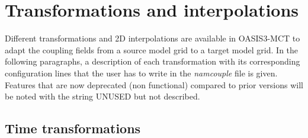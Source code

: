 \newpage
\chapter{Transformations and interpolations}
\label{sec_transformations}

Different transformations and 2D interpolations are available in
OASIS3-MCT to adapt the coupling fields from a source model grid to a
target model grid.  In the following paragraphs, a description of each
transformation with its corresponding configuration lines that the
user has to write in the {\it namcouple} file is given.  Features that
are now deprecated (non functional) compared to prior versions will be
noted with the string UNUSED but not described.

\section{Time transformations}
\label{subsec_timetrans}

